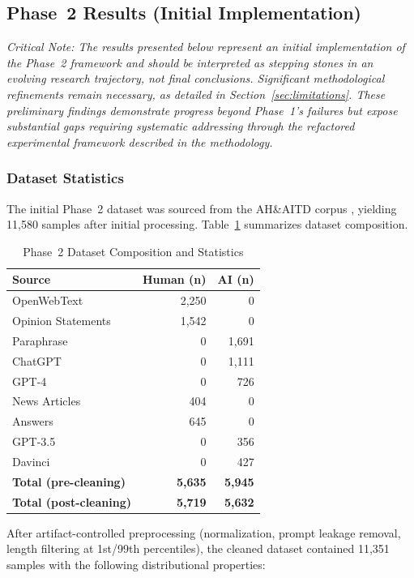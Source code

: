 \documentclass[conference]{IEEEtran}
\begin{document}
\subsection{Phase~2 Results (Initial Implementation)}

\emph{Critical Note: The results presented below represent an initial implementation of the Phase~2 framework and should be interpreted as stepping stones in an evolving research trajectory, not final conclusions. Significant methodological refinements remain necessary, as detailed in Section~\ref{sec:limitations}. These preliminary findings demonstrate progress beyond Phase~1's failures but expose substantial gaps requiring systematic addressing through the refactored experimental framework described in the methodology.}

\subsubsection{Dataset Statistics}

The initial Phase~2 dataset was sourced from the AH\&AITD corpus \cite{akram2023human}, yielding 11,580 samples after initial processing. Table~\ref{tab:dataset_stats} summarizes dataset composition.

\begin{table}[h]
\centering
\caption{Phase~2 Dataset Composition and Statistics}
\label{tab:dataset_stats}
\begin{tabular}{lrr}
\toprule
\textbf{Source} & \textbf{Human (n)} & \textbf{AI (n)} \\
\midrule
OpenWebText & 2,250 & 0 \\
Opinion Statements & 1,542 & 0 \\
Paraphrase & 0 & 1,691 \\
ChatGPT & 0 & 1,111 \\
GPT-4 & 0 & 726 \\
News Articles & 404 & 0 \\
Answers & 645 & 0 \\
GPT-3.5 & 0 & 356 \\
Davinci & 0 & 427 \\
\midrule
\textbf{Total (pre-cleaning)} & \textbf{5,635} & \textbf{5,945} \\
\textbf{Total (post-cleaning)} & \textbf{5,719} & \textbf{5,632} \\
\bottomrule
\end{tabular}
\end{table}

After artifact-controlled preprocessing (normalization, prompt leakage removal, length filtering at 1st/99th percentiles), the cleaned dataset contained 11,351 samples with the following distributional properties:
\end{document}
